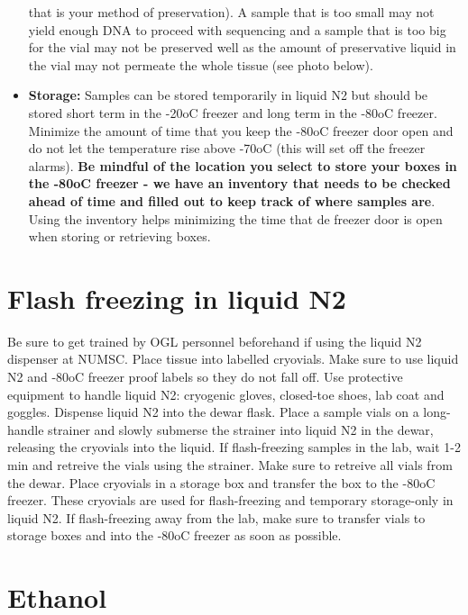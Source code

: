 \documentclass[
  letterpaper,
  DIV=11,
  numbers=noendperiod]{scrreprt}
\begin{document}
\begin{itemize}
  that is your method of preservation). A sample that is too small may
  not yield enough DNA to proceed with sequencing and a sample that is
  too big for the vial may not be preserved well as the amount of
  preservative liquid in the vial may not permeate the whole tissue (see
  photo below).
\item
  \textbf{Storage:} Samples can be stored temporarily in liquid N2 but
  should be stored short term in the -20oC freezer and long term in the
  -80oC freezer. Minimize the amount of time that you keep the -80oC
  freezer door open and do not let the temperature rise above -70oC
  (this will set off the freezer alarms). \textbf{Be mindful of the
  location you select to store your boxes in the -80oC freezer - we have
  an inventory that needs to be checked ahead of time and filled out to
  keep track of where samples are}. Using the inventory helps minimizing
  the time that de freezer door is open when storing or retrieving
  boxes.
\end{itemize}

\hypertarget{flash-freezing-in-liquid-n2}{%
\section*{\texorpdfstring{\textbf{Flash freezing in liquid
N2}}{Flash freezing in liquid N2}}\label{flash-freezing-in-liquid-n2}}


Be sure to get trained by OGL personnel beforehand if using the liquid
N2 dispenser at NUMSC. Place tissue into labelled cryovials. Make sure
to use liquid N2 and -80oC freezer proof labels so they do not fall off.
Use protective equipment to handle liquid N2: cryogenic gloves,
closed-toe shoes, lab coat and goggles. Dispense liquid N2 into the
dewar flask. Place a sample vials on a long-handle strainer and slowly
submerse the strainer into liquid N2 in the dewar, releasing the
cryovials into the liquid. If flash-freezing samples in the lab, wait
1-2 min and retreive the vials using the strainer. Make sure to retreive
all vials from the dewar. Place cryovials in a storage box and transfer
the box to the -80oC freezer. These cryovials are used for
flash-freezing and temporary storage-only in liquid N2. If
flash-freezing away from the lab, make sure to transfer vials to storage
boxes and into the -80oC freezer as soon as possible.

\hypertarget{ethanol}{%
\section*{\texorpdfstring{\textbf{Ethanol}}{Ethanol}}\label{ethanol}}
\end{document}
